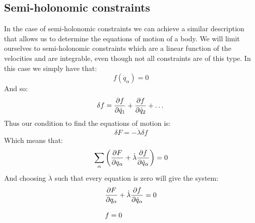 \subsection{Semi-holonomic constraints}
In the case of semi-holonomic constraints we can achieve a similar description that allows us to determine the equations of motion of a body. We will limit ourselves to semi-holonomic constraints which are a linear function of the velocities and are integrable, even though not all constraints are of this type. In this case we simply have that:
\begin{equation}
  f(\dot{q}_{\alpha}) = 0
\end{equation}
And so:
\begin{equation}
  \delta f = \pdv{f}{\dot{q}_1} + \pdv{f}{\dot{q}_2} + \dots
\end{equation}
Thus our condition to find the equations of motion is:
\begin{equation}
  \delta F = -\dot{\lambda}\delta f
\end{equation}
Which means that:
\begin{equation}
  \bigsum_{\alpha} \brackets{\pdv{F}{q_{\alpha}} + \dot{\lambda}\pdv{f}{\dot{q}_{\alpha}}} = 0
\end{equation}
And choosing $\dot{\lambda}$ such that every equation is zero will give the system:
\begin{equation}
  \begin{split}
    &\pdv{F}{q_{\alpha}} + \dot{\lambda}\pdv{f}{\dot{q}_{\alpha}} = 0 \\[8pt]
    &f = 0
  \end{split}
\end{equation}
